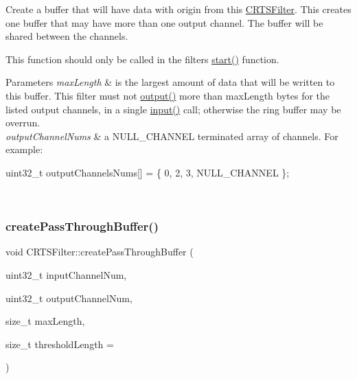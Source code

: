 Create a buffer that will have data with origin from this \hyperlink{classCRTSFilter}{C\+R\+T\+S\+Filter}. This creates one buffer that may have more than one output channel. The buffer will be shared between the channels.

This function should only be called in the filters\textquotesingle{} \hyperlink{classCRTSFilter_a15a3e99b38a67fd40559776d468b95fa}{start()} function.


\begin{DoxyParams}{Parameters}
{\em max\+Length} & is the largest amount of data that will be written to this buffer. This filter must not \hyperlink{classCRTSFilter_afe899250f3aa73aa8eb5aed7dfc371de}{output()} more than {\ttfamily max\+Length} bytes for the listed output channels, in a single \hyperlink{classCRTSFilter_ab75eb3db5914c0d6b3781439d46b2301}{input()} call; otherwise the ring buffer may be overrun.\\
\hline
{\em output\+Channel\+Nums} & a {\ttfamily N\+U\+L\+L\+\_\+\+C\+H\+A\+N\+N\+EL} terminated array of channels. For example\+: 
\begin{DoxyCode}
uint32\_t outputChannelsNums[] = \{ 0, 2, 3, NULL\_CHANNEL \};
\end{DoxyCode}
 \\
\hline
\end{DoxyParams}
\mbox{\label{classCRTSFilter_a462892f9ed127c6280f2e62f97aca5bc}} 
\subsubsection{\texorpdfstring{create\+Pass\+Through\+Buffer()}{createPassThroughBuffer()}}
{\footnotesize\ttfamily void C\+R\+T\+S\+Filter\+::create\+Pass\+Through\+Buffer (\begin{DoxyParamCaption}\item[{uint32\+\_\+t}]{input\+Channel\+Num,  }\item[{uint32\+\_\+t}]{output\+Channel\+Num,  }\item[{size\+\_\+t}]{max\+Length,  }\item[{size\+\_\+t}]{threshold\+Length = {} }\end{DoxyParamCaption})\hspace{0.3cm}{\ttfamily [protected]}}

